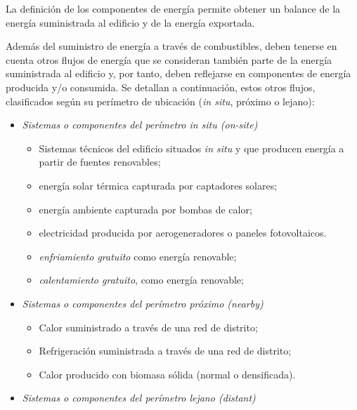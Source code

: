 \documentclass[10pt,notitlepage,oneside,a4paper]{article}
\begin{document}
\begin{myquote}\small
    La definición de los componentes de energía permite obtener un balance de la energía suministrada al edificio y de la energía exportada.

    Además del suministro de energía a través de combustibles, deben tenerse en cuenta otros flujos de energía que se consideran también parte de la energía suministrada al edificio y, por tanto, deben reflejarse en componentes de energía producida y/o consumida. Se detallan a continuación, estos otros flujos, clasificados según su perímetro de ubicación (\textit{in situ}, próximo o lejano):

    \begin{itemize}
        \item \textit{Sistemas o componentes del perímetro \textit{in situ} (on-site)}

              \begin{itemize}
                  \item Sistemas técnicos del edificio situados \textit{in situ} y que producen energía a partir de fuentes renovables;
                  \item energía solar térmica capturada por captadores solares;
                  \item energía ambiente capturada por bombas de calor;
                  \item electricidad producida por aerogeneradores o paneles fotovoltaicos.
                  \item \textit{enfriamiento gratuito} como energía renovable;
                  \item \textit{calentamiento gratuito}, como energía renovable;
              \end{itemize}

        \item \textit{Sistemas o componentes del perímetro \textit{próximo} (nearby)}

              \begin{itemize}
                  \item Calor suministrado a través de una red de distrito;
                  \item Refrigeración suministrada a través de una red de distrito;
                  \item Calor producido con biomasa sólida (normal o densificada).
              \end{itemize}

        \item \textit{Sistemas o componentes del perímetro \textit{lejano} (distant)}


\end{itemize}
\end{myquote}
\end{document}
